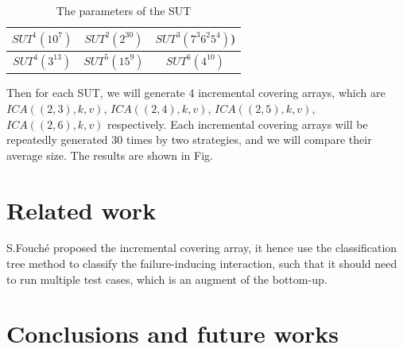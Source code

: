 \documentclass[conference]{IEEEtran}
\theoremstyle{definition}
\begin{document}
\begin{table}
\caption{The parameters of the SUT}
\label{ica_to_constuct}
\center
\setlength{\tabcolsep}{3pt}
\begin{tabular}{c | c | c }
\hline  $SUT^{1}(10^{7}) $& $SUT^{2}(2^{30})$ & $SUT^{3}(7^{3}6^{2}5^{4})$) \\
\hline  $SUT^{4}(3^{13})$ & $SUT^{5}(15^{9})$ & $SUT^{6}(4^{10})$ \\
\hline
\end{tabular}
  \end{table}
  
Then for each SUT, we will generate 4 incremental covering arrays, which are $ICA((2, 3), k ,v)$, $ICA((2, 4), k ,v)$, $ICA((2, 5), k ,v)$, $ICA((2, 6), k ,v)$ respectively. Each incremental covering arrays will be repeatedly generated 30 times by two strategies, and we will compare their average size. The results are shown in Fig. 



\section{Related work}

S.Fouch{\'e} \cite{fouche2009incremental} proposed the incremental covering array, it hence use the classification tree method to classify the failure-inducing interaction, such that it should need to run multiple test cases, which is an augment of the bottom-up.


\section{Conclusions and future works}
\end{document}
